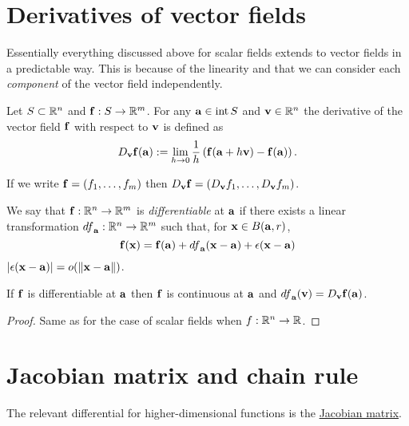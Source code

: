 \section{Derivatives of vector fields}

Essentially everything discussed above for scalar fields extends to vector fields in a predictable way.
This is because of the linearity and that we can consider each \emph{component} of the vector field independently.

\begin{definition}
    Let \(S\subset \bR^n\) and \(\ff:S\to \bR^m\).
    For any \(\aa \in \operatorname{int}S\) and \(\vv \in \bR^n\) the derivative of the vector field \(\ff\) with respect to \(\vv\) is defined as
    \[
        D_{\vv}\ff(\aa) :=
        \lim_{h\to 0} \frac{1}{h} \left(\ff(\aa+h \vv) - \ff(\aa)\right).
    \]
\end{definition}

\begin{remark}
    If we write \(\ff = (f_1,\ldots,f_m)\) then \(D_{\vv}\ff = (D_{\vv}f_1,\ldots,D_{\vv} f_m)\).
\end{remark}


\begin{definition*}[differentiable]
    We say that \(\ff: \bR^n \to \bR^m\) is \emph{differentiable} at \(\aa\) if there exists a linear transformation \({df}_{\aa}: \bR^n \to \bR^m\) such that, for \(\xx \in B(\aa,r)\),
    \[
        \ff(\xx) = \ff(\aa) + {df}_{\aa}(\xx-\aa) + \epsilon(\xx-\aa)
    \]
    \(\abs{\epsilon(\xx-\aa)} = \littleo{\norm{\xx-\aa}}\).
\end{definition*}


\begin{theorem}
    If \(\ff\) is differentiable at \(\aa\)
    then \(\ff\) is continuous at \(\aa\)
    and \( {df}_{\aa}(\vv) =D_{\vv}\ff(\aa) \).
\end{theorem}

\begin{proof}
    Same as for the case of scalar fields when \(f:\bR^n \to \bR\).
\end{proof}


\section{Jacobian matrix and chain rule}

The relevant differential for higher-dimensional functions is the \href{https://en.wikipedia.org/wiki/Jacobian_matrix_and_determinant}{Jacobian matrix}.


